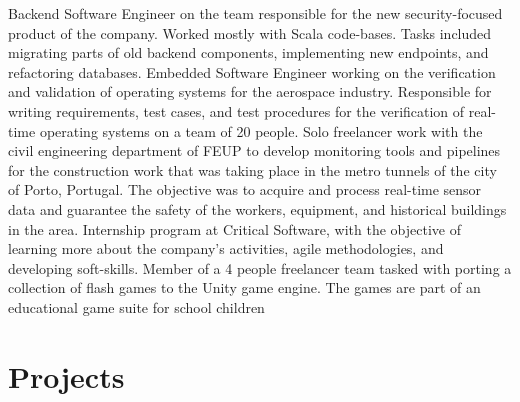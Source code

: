 \documentclass[letterpaper]{twentysecondcv} %
\begin{document}
\begin{twenty}
    {Backend Software Engineer on the team responsible for the new security-focused
    product of the company. Worked mostly with Scala code-bases. Tasks included
    migrating parts of old backend components, implementing new endpoints, and
    refactoring databases.}
    {Embedded Software Engineer working on the verification and validation of
    operating systems for the aerospace industry. Responsible for writing
    requirements, test cases, and test procedures for the verification of
    real-time operating systems on a team of 20 people.}
    {Solo freelancer work with the civil engineering department of FEUP to develop
    monitoring tools and pipelines for the construction work that was taking
    place in the metro tunnels of the city of Porto, Portugal. The objective
    was to acquire and process real-time sensor data and guarantee the safety
    of the workers, equipment, and historical buildings in the area.}
    {Internship program at Critical Software, with the objective of learning
    more about the company's activities, agile methodologies, and developing
    soft-skills.}
    {Member of a 4 people freelancer team tasked with porting a collection
    of flash games to the Unity game engine. The games are part of an educational
    game suite for school children}
\end{twenty}

\vfill


\newpage %

\makeprofile %



\section{Projects}
\end{document}
